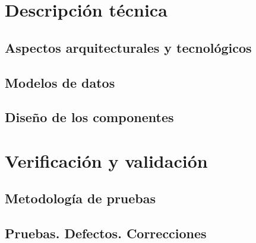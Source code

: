 \documentclass[10pt,spanish]{article}
\begin{document}
\section{Descripción técnica}

\blindtext
\subsection{Aspectos arquitecturales y tecnológicos}

\blindtext
\subsection{Modelos de datos}

\blindtext
\subsection{Diseño de los componentes}

\blindtext

\section{Verificación y validación}

\blindtext
\subsection{Metodología de pruebas}

\blindtext
\subsection{Pruebas. Defectos. Correcciones}

\blindtext
\end{document}
